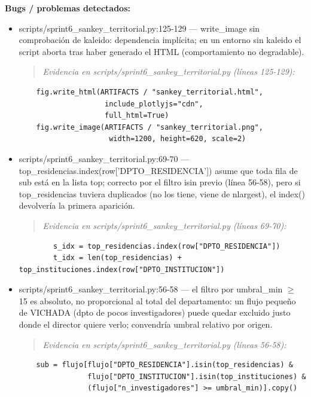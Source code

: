 \begin{tcolorbox}[riesgo]
\textbf{Bugs / problemas detectados:}
\begin{itemize}
  \item scripts/sprint6\_sankey\_territorial.py:125-129 --- write\_image sin comprobación de kaleido: dependencia implícita; en un entorno sin kaleido el script aborta tras haber generado el HTML (comportamiento no degradable).
\begin{quote}\footnotesize\ttfamily
\noindent\emph{Evidencia en scripts/sprint6\_sankey\_territorial.py (líneas 125-129):}
\end{quote}
\begin{lstlisting}
    fig.write_html(ARTIFACTS / "sankey_territorial.html",
                    include_plotlyjs="cdn",
                    full_html=True)
    fig.write_image(ARTIFACTS / "sankey_territorial.png",
                     width=1200, height=620, scale=2)
\end{lstlisting}

  \item scripts/sprint6\_sankey\_territorial.py:69-70 --- top\_residencias.index(row['DPTO\_RESIDENCIA']) asume que toda fila de sub está en la lista top; correcto por el filtro isin previo (línea 56-58), pero si top\_residencias tuviera duplicados (no los tiene, viene de nlargest), el index() devolvería la primera aparición.
\begin{quote}\footnotesize\ttfamily
\noindent\emph{Evidencia en scripts/sprint6\_sankey\_territorial.py (líneas 69-70):}
\end{quote}
\begin{lstlisting}
        s_idx = top_residencias.index(row["DPTO_RESIDENCIA"])
        t_idx = len(top_residencias) + top_instituciones.index(row["DPTO_INSTITUCION"])
\end{lstlisting}

  \item scripts/sprint6\_sankey\_territorial.py:56-58 --- el filtro por umbral\_min $\geq$ 15 es absoluto, no proporcional al total del departamento: un flujo pequeño de VICHADA (dpto de pocos investigadores) puede quedar excluido justo donde el director quiere verlo; convendría umbral relativo por origen.
\begin{quote}\footnotesize\ttfamily
\noindent\emph{Evidencia en scripts/sprint6\_sankey\_territorial.py (líneas 56-58):}
\end{quote}
\begin{lstlisting}
    sub = flujo[flujo["DPTO_RESIDENCIA"].isin(top_residencias) &
                flujo["DPTO_INSTITUCION"].isin(top_instituciones) &
                (flujo["n_investigadores"] >= umbral_min)].copy()
\end{lstlisting}

\end{itemize}
\end{tcolorbox}

